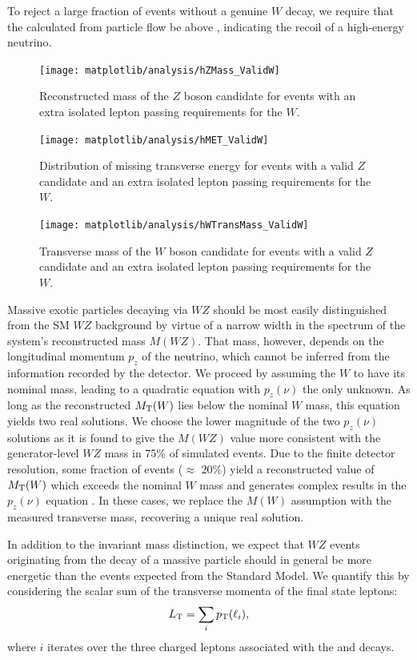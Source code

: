 To reject a large fraction of events without a genuine $W$ decay, we require that the \MET calculated from particle flow be above , indicating the recoil of a high-energy neutrino.

\begin{figure}
  \centering
  \texttt{[image: matplotlib/analysis/hZMass\_ValidW]}
  \caption{Reconstructed mass of the $Z$ boson candidate for events with an extra isolated lepton passing requirements for the $W$.}
  \label{fig:validw-zmass}
\end{figure}

\begin{figure}
  \centering
  \texttt{[image: matplotlib/analysis/hMET\_ValidW]}
  \caption{Distribution of missing transverse energy for events with a valid $Z$ candidate and an extra isolated lepton passing requirements for the $W$.}
  \label{fig:validw-met}
\end{figure}

\begin{figure}
  \centering
  \texttt{[image: matplotlib/analysis/hWTransMass\_ValidW]}
  \caption{Transverse mass of the $W$ boson candidate for events with a valid $Z$ candidate and an extra isolated lepton passing requirements for the $W$.}
  \label{fig:validw-transmass}
\end{figure}

Massive exotic particles decaying via $WZ$ should be most easily distinguished from the SM $WZ$ background by virtue of a narrow width in the spectrum of the system's reconstructed mass $M(WZ)$.  That mass, however, depends on the longitudinal momentum $p_z$ of the neutrino, which cannot be inferred from the information recorded by the detector.  We proceed by assuming the $W$ to have its nominal mass, leading to a quadratic equation with $p_z(\nu)$ the only unknown.  As long as the reconstructed $M_{\mathrm{T}}(W)$ lies below the nominal $W$ mass, this equation yields two real solutions.  We choose the lower magnitude of the two $p_z(\nu)$ solutions as it is found to give the $M(WZ)$ value more consistent with the generator-level $WZ$ mass in 75\% of simulated events.  Due to the finite detector resolution, some fraction of events ($\approx$ 20\%) yield a reconstructed value of $M_{\mathrm{T}}(W)$ which exceeds the nominal $W$ mass and generates complex results in the $p_z(\nu)$ equation
.  
In these cases, we replace the $M(W)$ assumption with the measured transverse mass, recovering a unique real solution.

In addition to the invariant mass distinction, we expect that $WZ$ events originating from the decay of a massive particle should in general be more energetic than the events expected from the Standard Model.  We quantify this by considering the scalar sum of the transverse momenta of the final state leptons:
\begin{equation}
  \label{eq:lepht}
  L_{\mathrm{T}} = \sum_i p_{\mathrm{T}}(\ell_i),
\end{equation}
where $i$ iterates over the three charged leptons associated with the \ztoll and \wtolnu decays.

